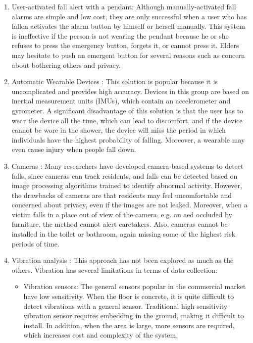\begin{enumerate}
\item User-activated fall alert with a pendant: Although manually-activated fall alarms are simple and low cost, they are only successful when a user who has fallen activates the alarm button by himself or herself manually. This system is ineffective if the person is not wearing the pendant because he or she refuses to press the emergency button, forgets it, or cannot press it. Elders may hesitate to push an emergent button for several reasons such as concern about bothering others and privacy.
\item Automatic Wearable Devices \cite{degen_jaeckel_rufer_wyss_2003, yang_hsu_2010, rihana_mondalak_2016}: This solution is popular because it is uncomplicated and provides high accuracy. Devices in this group are based on inertial measurement units (IMUs), which contain an accelerometer and gyrometer. A significant disadvantage of this solution is that the user has to wear the device all the time, which can lead to discomfort, and if the device cannot be wore in the shower, the device will miss the period in which individuals have the highest probability of falling. Moreover, a wearable may even cause injury when people fall down.
\item Cameras \cite{tsai_hsu_2019, ramirez_velastin_meza_fabregas_makris_farias_2021,taufeeque_koita_spicher_deserno_2021}: Many researchers have developed camera-based systems to detect falls, since cameras can track residents, and falls can be detected based on image processing algorithms trained to identify abnormal activity. However, the drawbacks of cameras are that residents may feel uncomfortable and concerned about privacy, even if the images are not leaked. Moreover, when a victim falls in a place out of view of the camera, e.g. an aed occluded by furniture, the method cannot alert caretakers. Also, cameras cannot be installed in the toilet or bathroom, again missing some of the highest risk periods of time.
\item Vibration analysis
\cite{alwan_rajendran_kell_mack_dalal_wolfe_felder_2006,liu_jiang_su_benzoni_maxwell_2019,clemente_li_valero_song_2020}: This approach has not been explored as much as the others. Vibration has several limitations in terms of data collection:
\begin{itemize}
\item Vibration sensors: The general sensors popular in the commercial market have low sensitivity. When the floor is concrete, it is quite difficult to detect vibrations with a general sensor. Traditional high sensitivity vibration sensor requires embedding in the ground, making it difficult to install. In addition, when the area is large, more sensors are required, which increases cost and complexity of the system.

\end{itemize}
\end{enumerate}
